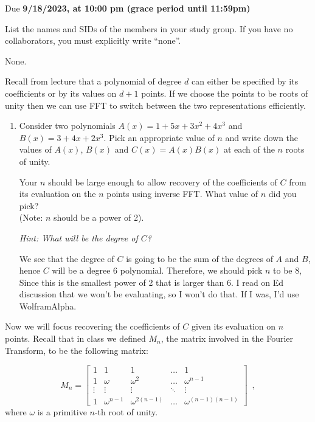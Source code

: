 \documentclass[11pt]{article}
\def\duedate{9/18/2023, at 10:00 pm (grace period until 11:59pm)}
\begin{document}
\maketitle


Due \textbf{\duedate}


List the names and SIDs of the members in your study group.
If you have no collaborators, you must explicitly write ``none''.

\begin{solution}
	None.
\end{solution}


Recall from lecture that a polynomial of degree $d$ can either be specified by its coefficients or by its values on $d+1$ points. If we choose the points to be roots of unity then we can use  FFT to switch between the two representations efficiently.

\begin{enumerate}[label=(\alph*)]
    \item  Consider two polynomials $A(x) = 1 + 5x + 3x^2 +4x^3$ and $B(x) = 3 + 4x + 2x^3$. Pick an appropriate value of $n$ and write down the values of $A(x)$, $B(x)$ and $C(x) = A(x)B(x)$ at each of the $n$ roots of unity. 
    
    Your $n$ should be large enough to allow recovery of the coefficients of $C$ from its evaluation on the $n$ points using inverse FFT. What value of $n$ did you pick? \\(Note: $n$ should be a power of 2).
    
    \emph{Hint: What will be the degree of $C$?}

	\begin{solution}
		We see that the degree of $C$ is going to be the sum of the degrees of $A$ and $B$, hence $C$ will be 
		a degree 6 polynomial. Therefore, we should pick $n$ to be $8$, Since this is the smallest 
		power of 2 that is larger than 6. I read on Ed discussion that we won't be evaluating, so I won't do 
		that. If I was, I'd use WolframAlpha.
	\end{solution}
\end{enumerate}

Now we will focus recovering the coefficients of $C$ given its evaluation on $n$ points. Recall that in class we defined $M_n$, the matrix involved in the Fourier Transform, to be the following matrix:

\[
M_n = 
\begin{bmatrix}
    1     & 1           & 1            & \dots  & 1 \\
    1     & \omega      & \omega^2     & \dots  & \omega^{n-1} \\
    \vdots & \vdots & \vdots & \ddots & \vdots \\
    1     & \omega^{n-1} & \omega^{2(n-1)} & \dots  & \omega^{(n-1)(n-1)}
\end{bmatrix} \enspace,
\]
where $\omega$ is a primitive $n$-th root of unity.
\end{document}
